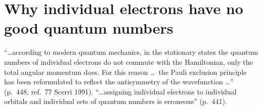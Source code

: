 \section{Why individual electrons have no good quantum numbers}\label{sec:qn}

\begin{reviewclaim}
``\dots according to modern quantum mechanics, in the stationary states the quantum numbers of individual
electrons do not commute with the Hamiltonian, only the total angular momentum does. For this reason
\dots\ the Pauli exclusion principle has been reformulated to reflect the antisymmetry of the
wavefunction \dots'' (p.~448, ref.~77 Scerri 1991). ``\dots assigning individual electrons to individual
orbitals and individual sets of quantum numbers is erroneous'' (p.~441).
\end{reviewclaim}

